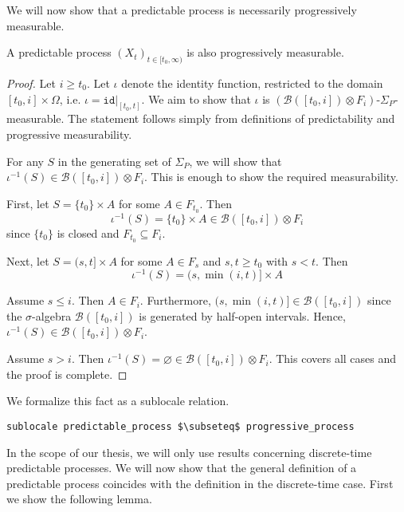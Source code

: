 We will now show that a predictable process is necessarily progressively measurable.

\begin{lemma}
	A predictable process $(X_t)_{t \in [t_0,\infty)}$ is also progressively measurable.
\end{lemma}
\begin{proof}
	Let $i \ge t_0$. Let $\iota$ denote the identity function, restricted to the domain $[t_0, i] \times \Omega$, i.e. $\iota = \texttt{id}\vert_{[t_0,t]}$. We aim to show that $\iota$ is $(\mathcal{B}([t_0,i]) \otimes F_i)$-$\Sigma_P$-measurable. The statement follows simply from definitions of predictability and progressive measurability.
	
	For any $S$ in the generating set of $\Sigma_P$, we will show that $\iota^{-1}(S) \in \mathcal{B}([t_0,i]) \otimes F_i$. This is enough to show the required measurability.
	
	First, let $S = \{t_0\} \times A$ for some $A \in F_{t_0}$.
	Then
	\[
		\iota^{-1}(S) = \{t_0\} \times A \in \mathcal{B}([t_0,i]) \otimes F_i
	\]
	since $\{t_0\}$ is closed and $F_{t_0} \subseteq F_i$.
	
	Next, let $S = (s,t] \times A$ for some $A \in F_s$ and $s, t \ge t_0$ with $s < t$.
	Then
	\[
		\iota^{-1}(S) = (s, \min(i, t)] \times A
	\]
	
	Assume $s \le i$. Then $A \in F_i$. Furthermore, $(s, \min(i, t)] \in \mathcal{B}([t_0,i])$ since the $\sigma$-algebra $\mathcal{B}([t_0,i])$ is generated by half-open intervals. 
	Hence, $\iota^{-1}(S) \in \mathcal{B}([t_0,i]) \otimes F_i$.
	
	Assume $s > i$. Then $\iota^{-1}(S) = \varnothing \in \mathcal{B}([t_0,i]) \otimes F_i$. This covers all cases and the proof is complete.
\end{proof}

We formalize this fact as a sublocale relation.

\begin{isalemma}
{\small
\begin{lstlisting}[style=isabelle]
sublocale predictable_process $\subseteq$ progressive_process
\end{lstlisting}
}
\end{isalemma}

In the scope of our thesis, we will only use results concerning discrete-time predictable processes. We will now show that the general definition of a predictable process coincides with the definition in the discrete-time case. First we show the following lemma.

